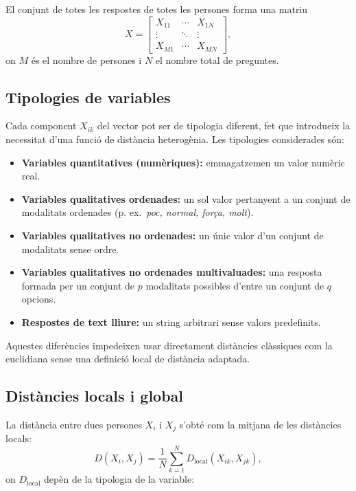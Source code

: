 \documentclass[a4paper,11pt]{article}
\begin{document}
El conjunt de totes les respostes de totes les persones forma una matriu
\[
  X =
  \begin{bmatrix}
    X_{11} & \cdots & X_{1N} \\
    \vdots & \ddots & \vdots \\
    X_{M1} & \cdots & X_{MN}
  \end{bmatrix},
\]
on $M$ és el nombre de persones i $N$ el nombre total de preguntes.

\subsection{Tipologies de variables}

Cada component $X_{ik}$ del vector pot ser de tipologia diferent,
fet que introdueix la necessitat d’una funció de distància heterogènia.
Les tipologies considerades són:

\begin{itemize}
  \item \textbf{Variables quantitatives (numèriques):}
        emmagatzemen un valor numèric real.
  \item \textbf{Variables qualitatives ordenades:}
        un sol valor pertanyent a un conjunt de modalitats ordenades
        (p. ex.\ \textit{poc, normal, força, molt}).
  \item \textbf{Variables qualitatives no ordenades:}
        un únic valor d’un conjunt de modalitats sense ordre.
  \item \textbf{Variables qualitatives no ordenades multivaluades:}
        una resposta formada per un conjunt de $p$ modalitats
        possibles d'entre un conjunt de $q$ opcions.
  \item \textbf{Respostes de text lliure:}
        un string arbitrari sense valors predefinits.
\end{itemize}

Aquestes diferències impedeixen usar directament distàncies clàssiques
com la euclidiana sense una definició local de distància adaptada.

\subsection{Distàncies locals i global}

La distància entre dues persones $X_i$ i $X_j$ s’obté com la mitjana
de les distàncies locals:
\[
  D(X_i , X_j) = \frac{1}{N}\sum_{k=1}^N D_\text{local}(X_{ik}, X_{jk}),
\]
on $D_\text{local}$ depèn de la tipologia de la variable:
\end{document}
